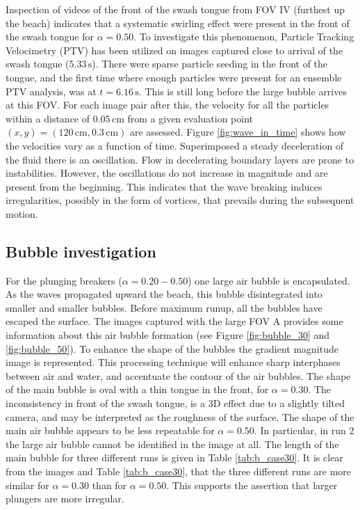\documentclass[review, authoryear]{elsarticle}
\newcommand{\s}{\,\mbox{s}}
\newcommand{\cm}{\,\mbox{cm}}
\begin{document}
Inspection of videos of the front of the swash tongue from FOV IV (furthest up the beach) indicates that a systematic swirling effect were present in the front of the swash tongue for $\alpha=0.50$. To investigate this phenomenon, Particle Tracking Velocimetry (PTV) has been utilized on images captured close to arrival of the swash tongue ($5.33\s$). There were sparse particle seeding in the front of the tongue, and the first time where enough particles were present for an ensemble PTV analysis, was at $t=6.16\s$. This is still long before the large bubble arrives at this FOV. For each image pair after this, the velocity for all the particles within a distance of $0.05\cm$ from a given evaluation point $(x,y)=(120\cm,0.3\cm)$ are assessed. Figure \ref{fig:wave_in_time} shows how the velocities vary as a function of time. Superimposed a steady deceleration of the fluid there is an 
oscillation.
Flow in decelerating boundary layers are prone to instabilities.
However, the oscillations do not increase in magnitude and are present
from the beginning. 
   This indicates that the wave breaking induces irregularities, possibly in the form of vortices, that prevails during the subsequent motion. 


 
 \subsection{Bubble investigation}
 \label{bub_inv}
 For the plunging breakers ($\alpha=0.20-0.50$) one large air bubble is encapsulated. As the waves propagated upward the beach, this bubble disintegrated into smaller and smaller bubbles. Before maximum runup, all the 
bubbles have escaped the surface. The images captured with the large FOV A provides some information about this air bubble formation (see Figure \ref{fig:bubble_30} and \ref{fig:bubble_50}). To enhance the shape of the bubbles the gradient magnitude image is represented. This processing technique will enhance sharp interphases between air and water, and accentuate the contour of the air bubbles.   The shape of the main bubble is oval with a thin tongue in the front, for $\alpha=0.30$. The inconsistency in front of the swash tongue, is a 3D effect due to a slightly tilted camera, and may be interpreted as the roughness of the surface.   The shape of the main air bubble appears to be less repeatable for $\alpha=0.50$. In particular, in run 2 the large air bubble cannot
 be identified in the image at all. The length of the main bubble for three different runs is given in Table \ref{tab:b_case30}. It is clear from the images and Table \ref{tab:b_case30}, that the three different runs are more similar for $\alpha=0.30$ than for $\alpha=0.50$. This supports the assertion that larger plungers are more irregular.
 
\end{document}
